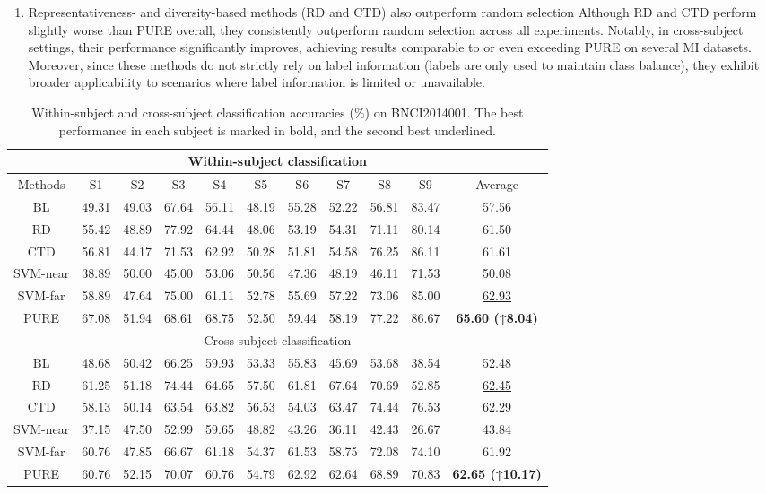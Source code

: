 \documentclass[journal,twocolumn]{IEEEtran}
\begin{document}
\begin{enumerate}
  \item {Representativeness- and diversity-based methods (RD and CTD) also outperform random selection} Although RD and CTD perform slightly worse than PURE overall, they consistently outperform random selection across all experiments. Notably, in cross-subject settings, their performance significantly improves, achieving results comparable to or even exceeding PURE on several MI datasets. Moreover, since these methods do not strictly rely on label information (labels are only used to maintain class balance), they exhibit broader applicability to scenarios where label information is limited or unavailable.
\end{enumerate}


\begin{table}[htpb] \centering
  \caption{Within-subject and cross-subject classification accuracies (\%) on BNCI2014001. The best performance in each subject is marked in bold, and the second best underlined.}
  \label{tab:2014001-result}
  \begin{tabular}{c|c|c|c|c|c|c|c|c|c|c}
  \toprule
  \multicolumn{11}{c}{Within-subject classification} \\
  \midrule
  Methods & S1 & S2 & S3 & S4 & S5 & S6 & S7 & S8 & S9 & Average \\
  \midrule
  BL & 49.31 & 49.03 & 67.64 & 56.11 & 48.19 & 55.28 & 52.22 & 56.81 & 83.47 & 57.56 \\
  RD & 55.42 & 48.89 & 77.92 & 64.44 & 48.06 & 53.19 & 54.31 & 71.11 & 80.14 & 61.50 \\
  CTD & 56.81 & 44.17 & 71.53 & 62.92 & 50.28 & 51.81 & 54.58 & 76.25 & 86.11 & 61.61 \\
  SVM-near & 38.89 & 50.00 & 45.00 & 53.06 & 50.56 & 47.36 & 48.19 & 46.11 & 71.53 & 50.08 \\
  SVM-far & 58.89 & 47.64 & 75.00 & 61.11 & 52.78 & 55.69 & 57.22 & 73.06 & 85.00 & \underline{62.93} \\
  PURE & 67.08 & 51.94 & 68.61 & 68.75 & 52.50 & 59.44 & 58.19 & 77.22 & 86.67 & \textbf{65.60 (↑8.04)} \\
  \midrule
  \multicolumn{11}{c}{Cross-subject classification} \\
  \midrule
  BL & 48.68 & 50.42 & 66.25 & 59.93 & 53.33 & 55.83 & 45.69 & 53.68 & 38.54 & 52.48 \\
  RD & 61.25 & 51.18 & 74.44 & 64.65 & 57.50 & 61.81 & 67.64 & 70.69 & 52.85 & \underline{62.45} \\
  CTD & 58.13 & 50.14 & 63.54 & 63.82 & 56.53 & 54.03 & 63.47 & 74.44 & 76.53 & 62.29 \\
  SVM-near & 37.15 & 47.50 & 52.99 & 59.65 & 48.82 & 43.26 & 36.11 & 42.43 & 26.67 & 43.84 \\
  SVM-far & 60.76 & 47.85 & 66.67 & 61.18 & 54.37 & 61.53 & 58.75 & 72.08 & 74.10 & 61.92 \\
  PURE & 60.76 & 52.15 & 70.07 & 60.76 & 54.79 & 62.92 & 62.64 & 68.89 & 70.83 & \textbf{62.65 (↑10.17)} \\
  \bottomrule
  \end{tabular}
\end{table}
\end{document}
